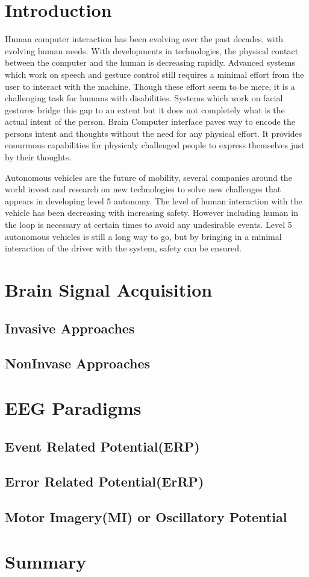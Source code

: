 \section*{Introduction}
Human computer interaction has been evolving over the past decades, with evolving human needs. With developments in technologies, the physical 
contact between the computer and the human is decreasing rapidly. Advanced systems which work on speech and gesture control still requires a minimal
effort from the user to interact with the machine. Though these effort seem to be mere, it is a challenging task for humans with disabilities. 
Systems which work on facial gestures bridge this gap to an extent but it does not completely what is the actual intent of the person. Brain Computer
interface paves way to encode the persons intent and thoughts without the need for any physical effort. It provides enourmous capabilities for 
physicaly challenged people to express themselves just by their thoughts. 

Autonomous vehicles are the future of mobility, several companies around the world invest and research on new technologies to solve new challenges 
that appears in developing level 5 autonomy. The level of human interaction with the vehicle has been decreasing with increasing safety. However
including human in the loop is necessary at certain times to avoid any undesirable events. Level  5 autonomous vehicles is still a long way to go, 
but by bringing in a minimal interaction of the driver with the system, safety can be ensured.

\section{Brain Signal Acquisition}
    
    \subsection{Invasive Approaches}

    \subsection{NonInvase Approaches}

\section{EEG Paradigms}

    \subsection{Event Related Potential(ERP)}

    \subsection{Error Related Potential(ErRP)}

    \subsection{Motor Imagery(MI) or Oscillatory Potential}


\section*{Summary}